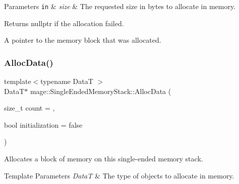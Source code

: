 \begin{DoxyParams}[1]{Parameters}
\mbox{\tt in}  & {\em size} & The requested size in bytes to allocate in memory. \\
\hline
\end{DoxyParams}
\begin{DoxyReturn}{Returns}
{\ttfamily nullptr} if the allocation failed. 

A pointer to the memory block that was allocated. 
\end{DoxyReturn}
\mbox{\label{classmage_1_1_single_ended_memory_stack_ae957490450194631b81b9f6ba84f5f5a}} 
\subsubsection{\texorpdfstring{Alloc\+Data()}{AllocData()}}
{\footnotesize\ttfamily template$<$typename DataT $>$ \\
DataT$\ast$ mage\+::\+Single\+Ended\+Memory\+Stack\+::\+Alloc\+Data (\begin{DoxyParamCaption}\item[{size\+\_\+t}]{count = {},  }\item[{bool}]{initialization = {\ttfamily false} }\end{DoxyParamCaption})\hspace{0.3cm}{\ttfamily [noexcept]}}

Allocates a block of memory on this single-\/ended memory stack.


\begin{DoxyTemplParams}{Template Parameters}
{\em DataT} & The type of objects to allocate in memory. \\
\hline
\end{DoxyTemplParams}

